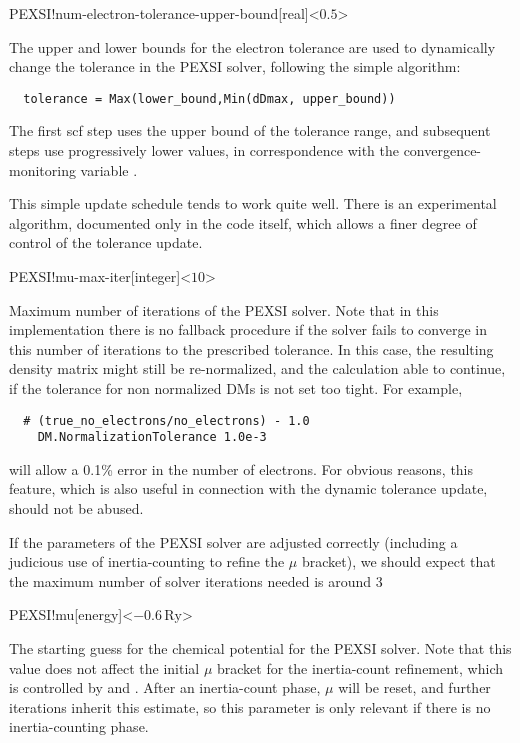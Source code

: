 \begin{fdfentry}{PEXSI!num-electron-tolerance-upper-bound}[real]<$0.5$>

  The upper and lower bounds for the electron tolerance are used to
  dynamically change the tolerance in the PEXSI solver, following the
  simple algorithm:
\begin{verbatim}
  tolerance = Max(lower_bound,Min(dDmax, upper_bound))
\end{verbatim}
  The first scf step uses the upper bound of the tolerance range, and
  subsequent steps use progressively lower values, in correspondence
  with the convergence-monitoring variable .
  
  \note This simple update schedule tends to work quite well. There is
  an experimental algorithm, documented only in the code itself, which
  allows a finer degree of control of the tolerance update.

\end{fdfentry}


\begin{fdfentry}{PEXSI!mu-max-iter}[integer]<$10$>

  Maximum number of iterations of the PEXSI solver. Note that in this
  implementation there is no fallback procedure if the solver fails to
  converge in this number of iterations to the prescribed
  tolerance. In this case, the resulting density matrix might still be
  re-normalized, and the calculation able to continue, if the
  tolerance for non normalized DMs is not set too tight. For example,
\begin{verbatim}
  # (true_no_electrons/no_electrons) - 1.0
    DM.NormalizationTolerance 1.0e-3  
\end{verbatim}
  will allow a 0.1\% error in the number of electrons. For obvious
  reasons, this feature, which is also useful in connection with the
  dynamic tolerance update, should not be abused.

  If the parameters of the PEXSI solver are adjusted correctly
  (including a judicious use of inertia-counting to refine the $\mu$
  bracket), we should expect that the maximum number of solver
  iterations needed is around 3

\end{fdfentry}

\begin{fdfentry}{PEXSI!mu}[energy]<$-0.6\,\mathrm{Ry}$>
  
  The starting guess for the chemical potential for the PEXSI
  solver. Note that this value does not affect the initial $\mu$
  bracket for the inertia-count refinement, which is controlled by
   and . After an inertia-count
  phase, $\mu$ will be reset, and further iterations inherit this
  estimate, so this parameter is only relevant if there is no
  inertia-counting phase.

\end{fdfentry}

